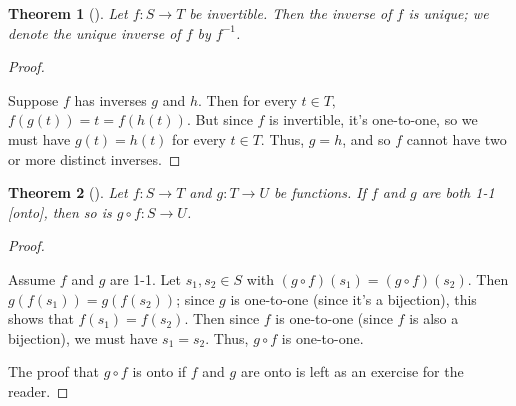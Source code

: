 \documentclass[10pt,openany,oneside]{book}
\theoremstyle{plain}
\newtheorem{theorem}{Theorem}[section]
\theoremstyle{definition}
\theoremstyle{definition}
\theoremstyle{definition}
\theoremstyle{definition}
\numberwithin{equation}{section}
\begin{document}
\begin{theorem}[{}]\label{theorem-2}
\label{notation-28}
 Let \(f:S\to T\) be invertible. Then the  inverse of \(f\) is unique; we denote the unique inverse of \(f\) by \(f^{-1}\).%
\end{theorem}
\begin{proof}\hypertarget{proof-2}{}
Suppose \(f\) has inverses \(g\) and \(h\). Then for every \(t\in T,\) \(f(g(t))=t=f(h(t))\). But since \(f\) is invertible, it's one-to-one, so we must have \(g(t)=h(t)\) for every \(t\in T\). Thus, \(g=h\), and so \(f\) cannot have two or more distinct inverses.%
\end{proof}
\begin{theorem}[{}]\label{compbij}
Let \(f:S\to T\) and \(g:T\to U\) be functions. If \(f\) and \(g\) are both 1-1 [onto], then so is \(g\circ f: S\to U\).%
\end{theorem}
\begin{proof}\hypertarget{proof-3}{}
Assume \(f\) and \(g\) are 1-1. Let \(s_1, s_2\in S\) with \((g\circ f)(s_1)=(g\circ f)(s_2)\). Then \(g(f(s_1))=g(f(s_2))\); since \(g\) is one-to-one (since it's a bijection), this shows that \(f(s_1)=f(s_2)\). Then since \(f\) is one-to-one (since \(f\) is also a bijection), we must have \(s_1=s_2\). Thus, \(g\circ f\) is one-to-one.%
\par
The proof that \(g\circ f\) is onto if \(f\) and \(g\) are onto is left as an exercise for the reader.%
\end{proof}
\typeout{************************************************}
\typeout{************************************************}
\end{document}
